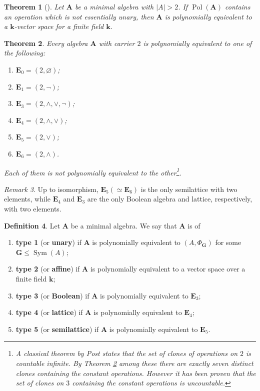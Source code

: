 \documentclass{amsart}
\theoremstyle{plain}
\newtheorem{theorem}{Theorem}[section]
\theoremstyle{definition}
\newtheorem{definition}[theorem]{Definition}
\theoremstyle{remark}
\newtheorem{remark}[theorem]{Remark}
\DeclareMathOperator{\Pol}{Pol}
\DeclareMathOperator{\Sym}{Sym}
\begin{document}
\begin{theorem}
    [\cite{classification-minimal}]
    Let $\mathbf{A}$ be a minimal algebra with $|A| > 2$.  
    If $\Pol(\mathbf{A})$ contains an operation which is not essentially unary, then $\mathbf{A}$ is polynomially equivalent to a $\mathbf{k}$-vector space for a finite field $\mathbf{k}$. 
\end{theorem}


\begin{theorem}
    \label{classification-two}
    Every algebra $\mathbf{A}$ with carrier $2$ is polynomially equivalent to one of the following: 
    \begin{enumerate}
        \item $\mathbf{E}_0= (2, \varnothing)$;
        \item $\mathbf{E}_1 = (2, \lnot)$; 
        \item $\mathbf{E}_3 = (2, \land, \lor, \lnot)$; 
        \item $\mathbf{E}_4 = (2, \land, \lor)$; 
        \item $\mathbf{E}_5 = (2, \lor)$; 
        \item $\mathbf{E}_6 = (2, \land)$.
    \end{enumerate}
    Each of them is not polynomially equivalent to the other\footnote{A classical theorem by Post states that the set of clones of operations on $2$ is countable infinite. 
    By Theorem \ref{classification-two} among these there are exactly seven distinct clones containing the constant operations.
    However it has been proven that the set of clones on $3$ containing the constant operations is uncountable.}.
\end{theorem}

\begin{remark}
    Up to isomorphism, $\mathbf{E}_5 (\simeq \mathbf{E}_6)$ is the only semilattice with two elements, while $\mathbf{E}_4$ and $\mathbf{E}_3$ are the only Boolean algebra and lattice, respectively, with two elements. 
\end{remark}

\begin{definition}
    Let $\mathbf{A}$ be a minimal algebra. 
    We say that $\mathbf{A}$ is of 
    \begin{enumerate}
        \item \textbf{type 1} (or \textbf{unary}) if $\mathbf{A}$ is polynomially equivalent to $(A, \Phi_\mathbf{G})$ for some $\mathbf{G} \le \Sym(A)$; 
        \item \textbf{type 2} (or \textbf{affine}) if $\mathbf{A}$ is polynomially equivalent to a vector space over a finite field $\mathbf{k}$; 
        \item \textbf{type 3} (or \textbf{Boolean}) if $\mathbf{A}$ is polynomially equivalent to $\mathbf{E}_3$;
        \item \textbf{type 4} (or \textbf{lattice}) if $\mathbf{A}$ is polynomially equivalent to $\mathbf{E}_4$;
        \item \textbf{type 5} (or \textbf{semilattice}) if $\mathbf{A}$ is polynomially equivalent to $\mathbf{E}_5$. 
    \end{enumerate}
\end{definition}
\end{document}
